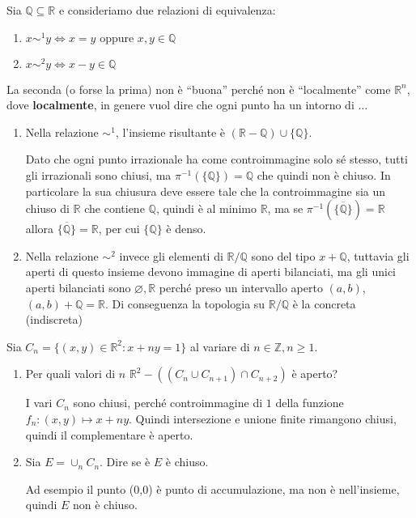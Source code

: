 \begin{example}
    Sia \(\mathbb{Q} \subseteq \mathbb{R} \) e consideriamo due relazioni di
    equivalenza:
\begin{enumerate}[label = \arabic*)]
    \item \(x \sim^{1} y \iff x = y \text{ oppure } x, y \in  \mathbb{Q}\) 
    \item  \(x \sim^{2} y \iff x - y \in  \mathbb{Q}\) 
\end{enumerate}
La seconda (o forse la prima) non è ``buona'' perché non è ``localmente'' come
\(\mathbb{R}^{n}\), dove \textbf{localmente}, in genere vuol dire che ogni punto ha un
intorno di \(\dots\) 

\begin{enumerate}[label = \arabic*)]
    \item Nella relazione \(\sim^{1}\), l'insieme risultante è \((\mathbb{R} -
        \mathbb{Q}) \cup \{\mathbb{Q}\} \).

        Dato che ogni punto irrazionale ha come controimmagine solo sé stesso,
        tutti gli irrazionali sono chiusi, ma \(\pi ^{-1}(\{\mathbb{Q}\} ) =
        \mathbb{Q}\) che quindi non è chiuso. In particolare la sua chiusura
        deve essere tale che la controimmagine sia un chiuso di \(\mathbb{R}\)
        che contiene \(\mathbb{Q}\), quindi è al minimo \(\mathbb{R}\), ma se
        \(\pi ^{-1}(\overline{\{\mathbb{Q}\}}) = \mathbb{R}\) allora
        \(\overline{\{\mathbb{Q}\} } = \mathbb{R}\), per cui \(\{\mathbb{Q}\} \)
        è denso.
    \item Nella relazione \(\sim^{2}\) invece gli elementi di \(\mathbb{R} /
        \mathbb{Q}\) sono del tipo \(x + \mathbb{Q}\), tuttavia gli aperti di
        questo insieme devono immagine di aperti bilanciati, ma gli
        unici aperti bilanciati sono \(\varnothing, \mathbb{R}\) perché preso un
        intervallo aperto \((a, b)\), \((a, b) + \mathbb{Q} = \mathbb{R}\). 
        Di conseguenza la topologia su \(\mathbb{R} / \mathbb{Q}\)  è la
        concreta (indiscreta)
\end{enumerate}
\end{example}

\begin{example}
    Sia \(C_n = \{(x, y) \in \mathbb{R}^2 : x + ny = 1\} \) al variare di \(n
    \in \mathbb{Z}, n \ge 1\).
\begin{enumerate}[label = \arabic*.]
    \item Per quali valori di \(n\) \(\mathbb{R}^2 - ((C_n \cup C_{n+1}) \cap
        C_{n+2})\) è aperto?

        I vari \(C_n\) sono chiusi, perché controimmagine di \(1\) della
        funzione \(f_n: (x,y) \mapsto x + ny\). Quindi intersezione e unione
        finite rimangono chiusi, quindi il complementare è aperto.
    \item Sia \(E = \cup_n C_n\). Dire se è \(E\) è chiuso.
        
        Ad esempio il punto (0,0) è punto di accumulazione, ma non è
        nell'insieme, quindi \(E\) non è chiuso.
\end{enumerate}
\end{example}

